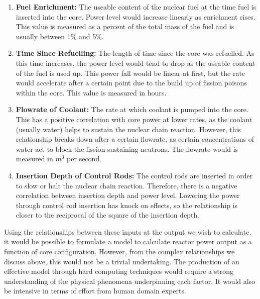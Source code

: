 
\begin{enumerate}
	
	\item \textbf{Fuel Enrichment:} The useable content of the nuclear fuel at the time fuel is inserted into the core. Power level would increase linearly as enrichment rises. This value is measured as a percent of the total mass of the fuel and is usually between 1\% and 5\%.
	 
	\item \textbf{Time Since Refuelling:} The length of time since the core was refuelled. As this time increases, the power level would tend to drop as the useable content of the fuel is used up. This power fall would be linear at first, but the rate would accelerate  after a certain point due to the build up of fission poisons within the core. This value is measured in hours.
	
	\item  \textbf{Flowrate of Coolant:} The rate at which coolant is pumped into the core. This has a positive correlation with core power at lower rates, as the coolant (usually water) helps to sustain the nuclear chain reaction. However, this relationship breaks down after a certain flowrate, as certain concentrations of water act to block the fission sustaining neutrons. The flowrate would  is measured in $m^3$ per second.
	
	\item \textbf{Insertion Depth of Control Rods:} The control rods are inserted in order to slow or halt the nuclear chain reaction. Therefore, there is a negative correlation between insertion depth and power level. Lowering the power through control rod insertion has knock on effects, so the relationship is closer to the reciprocal of the square of the insertion depth.
\end{enumerate}

\noindent
Using the relationships between these inputs at the output we wish to calculate, it would be possible to formulate a model to calculate reactor power output as a function of core configuration. However, from the complex relationships we discuss above, this would not be a trivial undertaking. The production of an effective model through hard computing techniques would require a strong understanding of the physical phenomena underpinning each factor. It would also be intensive in terms of effort from human domain experts. \\


